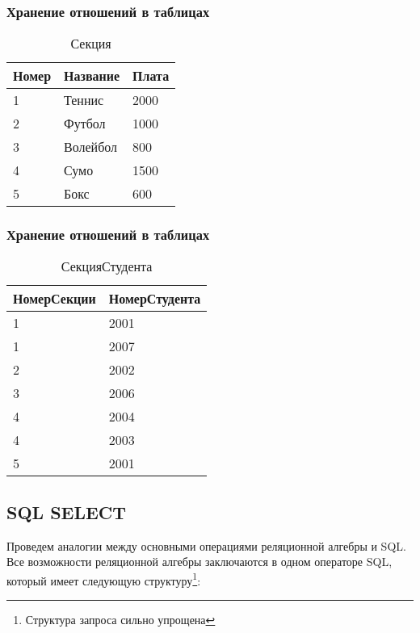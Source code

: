 \begin{frame}
    \frametitle{Хранение отношений в таблицах}

    \begin{table}[!ht]
        \caption{Секция}
        \begin{tabular}{|l|l|l|}
            \hline\hline
            Номер   & Название  & Плата\\
            \hline\hline
            1       & Теннис    & 2000\\
            2       & Футбол    & 1000\\
            3       & Волейбол  & 800\\
            4       & Сумо      & 1500\\
            5       & Бокс      & 600\\
            \hline
        \end{tabular}
    \end{table}
\end{frame}

\begin{frame}
    \frametitle{Хранение отношений в таблицах}

    \begin{table}[!ht]
        \caption{СекцияСтудента}
        \begin{tabular}{|l|l|}
            \hline\hline
            НомерСекции     & НомерСтудента \\
            \hline\hline
            1               & 2001\\
            1               & 2007\\
            2               & 2002\\
            3               & 2006\\
            4               & 2004\\
            4               & 2003\\
            5               & 2001\\
            \hline
        \end{tabular}
    \end{table}
\end{frame}

\subsection{SQL SELECT}
Проведем аналогии между основными операциями реляционной алгебры и SQL. Все возможности реляционной алгебры заключаются в одном операторе SQL, который имеет следующую структуру\footnote{Структура запроса сильно упрощена}:

